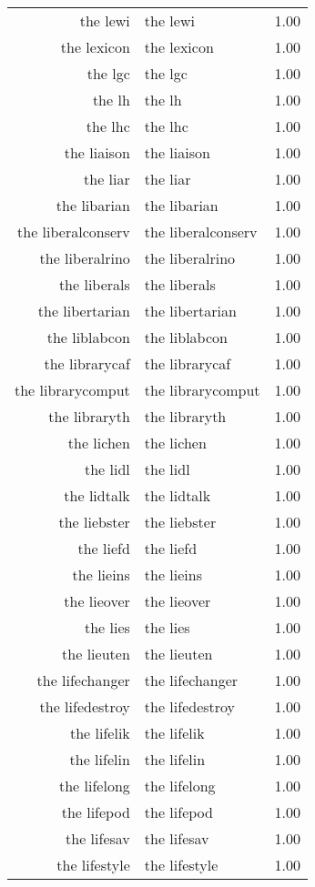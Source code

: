\begin{table}[ht]
\begin{tabular}{rlr}
  the lewi & the lewi & 1.00 \\ 
  the lexicon & the lexicon & 1.00 \\ 
  the lgc & the lgc & 1.00 \\ 
  the lh & the lh & 1.00 \\ 
  the lhc & the lhc & 1.00 \\ 
  the liaison & the liaison & 1.00 \\ 
  the liar & the liar & 1.00 \\ 
  the libarian & the libarian & 1.00 \\ 
  the liberalconserv & the liberalconserv & 1.00 \\ 
  the liberalrino & the liberalrino & 1.00 \\ 
  the liberals & the liberals & 1.00 \\ 
  the libertarian & the libertarian & 1.00 \\ 
  the liblabcon & the liblabcon & 1.00 \\ 
  the librarycaf & the librarycaf & 1.00 \\ 
  the librarycomput & the librarycomput & 1.00 \\ 
  the libraryth & the libraryth & 1.00 \\ 
  the lichen & the lichen & 1.00 \\ 
  the lidl & the lidl & 1.00 \\ 
  the lidtalk & the lidtalk & 1.00 \\ 
  the liebster & the liebster & 1.00 \\ 
  the liefd & the liefd & 1.00 \\ 
  the lieins & the lieins & 1.00 \\ 
  the lieover & the lieover & 1.00 \\ 
  the lies & the lies & 1.00 \\ 
  the lieuten & the lieuten & 1.00 \\ 
  the lifechanger & the lifechanger & 1.00 \\ 
  the lifedestroy & the lifedestroy & 1.00 \\ 
  the lifelik & the lifelik & 1.00 \\ 
  the lifelin & the lifelin & 1.00 \\ 
  the lifelong & the lifelong & 1.00 \\ 
  the lifepod & the lifepod & 1.00 \\ 
  the lifesav & the lifesav & 1.00 \\ 
  the lifestyle & the lifestyle & 1.00 \\ 

\end{tabular}
\end{table}
